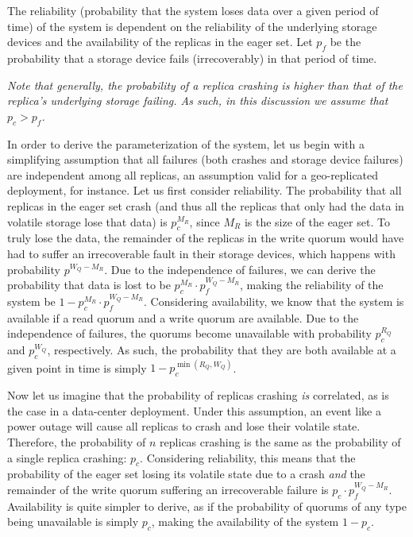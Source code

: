 The reliability (probability that the system loses data over a
given period of time) of the
system is dependent on the reliability of the underlying storage
devices and the availability of the replicas in the eager set.
Let $p_f$ be the probability that a storage device fails
(irrecoverably) in that period of time.

\emph{Note that generally, the probability of a replica crashing
is higher than that of the replica's underlying storage failing.
As such, in this discussion we assume that $p_c > p_f$.}

In order to derive the parameterization of the system, let us
begin with a simplifying assumption that all failures (both
crashes and storage device failures) are independent among all
replicas, an assumption valid for a geo-replicated deployment,
for instance. Let us first consider reliability. The probability
that all replicas in the eager set crash (and thus all the
replicas that only had the data in volatile storage lose that
data) is $p_c^{M_R}$, since $M_R$ is the size of the eager set.
To truly lose the data, the remainder of the replicas in the
write quorum would have had to suffer an irrecoverable fault in
their storage devices, which happens with probability $p^{W_Q -
M_R}$. Due to the independence of failures, we can derive the
probability that data is lost to be $p_c^{M_R} \cdot p_f^{W_Q -
M_R}$, making the reliability of the system be $1 - p_c^{M_R}
\cdot p_f^{W_Q - M_R}$. Considering availability, we know that
the system is available if a read quorum and a write quorum are
available. Due to the independence of failures, the quorums
become unavailable with probability $p_c^{R_Q}$ and $p_c^{W_Q}$,
respectively. As such, the probability that they are both
available at a given point in time is simply $1 - p_c^{\min(R_Q,
W_Q)}$.

Now let us imagine that the probability of replicas crashing
\emph{is} correlated, as is the case in a data-center deployment.
Under this assumption, an event like a power outage will cause
all replicas to crash and lose their volatile state. Therefore,
the probability of $n$ replicas crashing is the same as the
probability of a single replica crashing: $p_c$. Considering
reliability, this means that the probability of the eager set
losing its volatile state due to a crash \emph{and} the remainder
of the write quorum suffering an irrecoverable failure is $p_c
\cdot p_f^{W_Q - M_R}$. Availability is quite simpler to derive,
as if the probability of quorums of any type being unavailable is
simply $p_c$, making the availability of the system $1 - p_c$.

